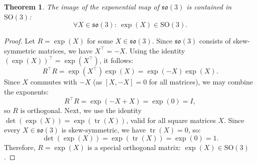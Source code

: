 \documentclass{amsart}
\newtheorem{theorem}{Theorem}[section]
\theoremstyle{definition}
\theoremstyle{remark}
\DeclareMathOperator{\tr}{tr}
\begin{document}
\begin{theorem}\label{thm:so3_exp_map_in_SO3}
  The image of the exponential map of $\mathfrak{so}(3)$ is contained in $\mathrm{SO}(3)$:
  \[
  \forall X \in \mathfrak{so}(3):\ \exp(X) \in \mathrm{SO}(3).
  \]
\end{theorem}
\begin{proof}
  Let $R = \exp(X)$ for some $X \in \mathfrak{so}(3)$. Since $\mathfrak{so}(3)$ consists of skew-symmetric matrices, we have $X^\top = -X$. Using the identity $\left(\exp(X)\right)^\top = \exp(X^\top)$, it follows:
  \[
  R^\top R = \exp(X^\top)\exp(X) = \exp(-X)\exp(X).
  \]
  Since $X$ commutes with $-X$ (as $[X, -X] = 0$ for all matrices), we may combine the exponents:
  \[
  R^\top R = \exp(-X + X) = \exp(0) = I,
  \]
  so $R$ is orthogonal. Next, we use the identity $\det(\exp(X)) = \exp(\tr(X))$, valid for all square matrices $X$. Since every $X \in \mathfrak{so}(3)$ is skew-symmetric, we have $\tr(X) = 0$, so:
  \[
  \det(\exp(X)) = \exp(\tr(X)) = \exp(0) = 1.
  \]
  Therefore, $R = \exp(X)$ is a special orthogonal matrix: $\exp(X) \in \mathrm{SO}(3)$.
\end{proof}
\end{document}
